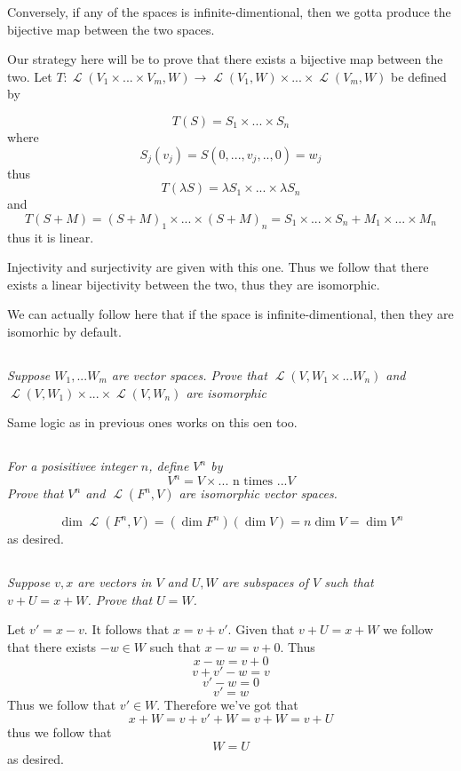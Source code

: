 \documentclass[11pt,oneside,titlepage]{book}
\DeclareMathOperator \map {\mathcal {L}}
\begin{document}
Conversely, if any of the spaces is infinite-dimentional, then we gotta produce the bijective
map between the two spaces.


Our strategy here will be to prove that there exists a bijective map between the two.
Let $T: \map(V_1 \times ... \times V_m, W) \to \map(V_1, W) \times ... \times \map(V_m, W)$
be defined by

$$T(S) = S_1 \times ... \times S_n$$
where
$$S_j(v_j) = S(0, ..., v_j, .., 0) = w_j$$
thus
$$T(\lambda S) = \lambda S_1 \times ... \times \lambda S_n$$
and
$$T(S + M) = (S + M)_1 \times ... \times (S + M)_n = S_1 \times ... \times S_n +
M_1 \times ... \times M_n$$
thus it is linear.

Injectivity and surjectivity are given with this one. Thus we follow that there exists a linear
bijectivity between the two, thus they are isomorphic.

We can actually follow here that if the space is infinite-dimentional, then they are isomorhic
by default.

\subsection{}

\textit{Suppose $W_1, ... W_m$ are vector spaces. Prove that
  $\map(V, W_1 \times  ... W_n)$ and $\map(V, W_1) \times ... \times \map(V, W_n)$ are isomorphic }

Same logic as in previous ones works on this oen too.

\subsection{}

\textit{For a posisitivee integer $n$, define $V^n$ by}
$$V^n = V \times ...\text{ n times }... V$$
\textit{Prove that $V^n$ and $\map(F^n, V)$ are isomorphic vector spaces.}

$$\dim \map(F^n, V) = (\dim F^n) ( \dim V) =  n \dim V = \dim V^n$$
as desired.

\subsection{}

\textit{Suppose $v, x$ are vectors in $V$ and $U, W$ are subspaces of $V$ such that
  $v + U = x + W$. Prove that $U = W$.}

Let $v'= x - v$. It follows that $x = v + v'$. Given that $v + U = x + W$ we follow
that there exists $-w \in W$ such that $x - w = v + 0$. Thus
$$x - w = v + 0$$
$$v + v' - w = v$$
$$v' - w = 0$$
$$v' = w$$
Thus we follow that $v' \in W$. Therefore we've got that
$$x + W = v + v' + W = v + W = v + U$$
thus we follow that
$$W = U$$
as desired.
\end{document}
